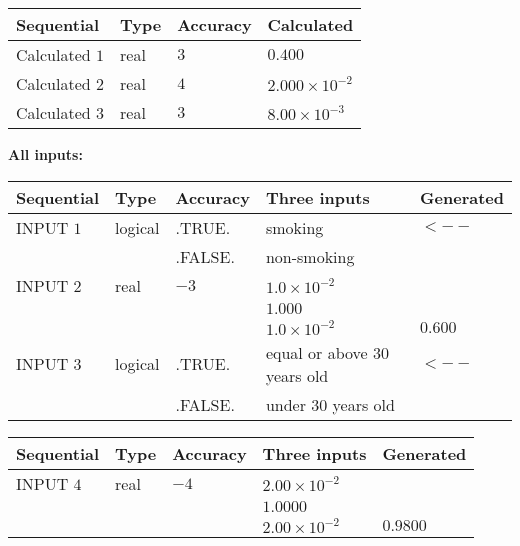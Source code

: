 \documentclass[12pt]{article}
\begin{document}
   
   
   
\noindent{}
   
   
  
  
\noindent\begin{tabular}{|l|l|l|l|}
\hline
 Sequential & Type & Accuracy & Calculated \\ 
\hline
 
 
  Calculated $            1 $ & real & $            3  $ & 
 $ 0.400 $ 
 \\  \hline  
 
 
  Calculated $            2 $ & real & $            4  $ & 
 $ 2.000 \times 10^{-2} $ 
 \\  \hline  
 
 
  Calculated $            3 $ & real & $            3  $ & 
 $ 8.00 \times 10^{-3} $ 
 \\  \hline  
 \end{tabular}
   
   
   
   
\noindent\vspace{0.1in}\hspace{-0.08in} {\textbf{\Large{All inputs: }}}
   
   
  
  
\noindent\begin{tabular}{|l|l|l|l|l|}
\hline
 Sequential & Type & Accuracy & Three inputs & Generated \\ 
\hline
 
 
  INPUT $            1 $ & logical & .TRUE. & 
 smoking & 
  $ <-- $ 
  \\
  & & .FALSE. & 
  non-smoking & 
 \\  \hline  
 
 
  INPUT $            2 $ & real & $           -3  $ & $
 1.0 \times 10^{-2}
  $ & \\
  & & &  $
 1.000
  $ & \\
  & & &  $
 1.0 \times 10^{-2}
 $ & $ 0.600 $ 
 \\  \hline  
 
 
  INPUT $            3 $ & logical & .TRUE. & 
 equal or above 30 years old & 
  $ <-- $ 
  \\
  & & .FALSE. & 
  under 30 years old & 
 \\  \hline  
 \end{tabular}
   
   
  
  
\noindent\begin{tabular}{|l|l|l|l|l|}
\hline
 Sequential & Type & Accuracy & Three inputs & Generated \\ 
\hline
 
 
  INPUT $            4 $ & real & $           -4  $ & $
 2.00 \times 10^{-2}
  $ & \\
  & & &  $
 1.0000
  $ & \\
  & & &  $
 2.00 \times 10^{-2}
 $ & $ 0.9800 $ 
 \\  \hline  
 \end{tabular}
   
\end{document}
